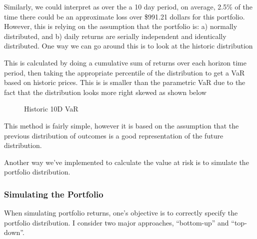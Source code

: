 \documentclass[letterpaper,10pt,english]{sphinxmanual}
\begin{document}
Similarly, we could interpret as over the a 10 day period, on average,
2.5\% of the time there could be an approximate loss over \$991.21 dollars
for this portfolio. However, this is relying on the assumption that the
portfolio is: a) normally distributed, and b) daily returns are serially
independent and identically distributed. One way we can go around this
is to look at the historic distribution

%
\begin{sphinxVerbatim}[commandchars=\\\{\}]
   
\end{sphinxVerbatim}

This is calculated by doing a cumulative sum of returns over each
horizon time period, then taking the appropriate percentile of the
distribution to get a VaR based on historic prices. This is is smaller
than the parametric VaR due to the fact that the distribution looks more
right skewed as shown below

\begin{figure}[htbp]
\centering
\capstart

\noindent{}
\caption{Historic 10D VaR}\label{\detokenize{gettingstarted:id3}}\end{figure}

This method is fairly simple, however it is based on the assumption that
the previous distribution of outcomes is a good representation of the
future distribution.

Another way we’ve implemented to calculate the value at risk is to
simulate the portfolio distribution.


\subsubsection{Simulating the Portfolio}
\label{\detokenize{gettingstarted:simulating-the-portfolio}}
When simulating portfolio returns, one’s objective is to correctly
specify the portfolio distribution. I consider two major approaches,
“bottom-up” and “top-down”.
\end{document}
